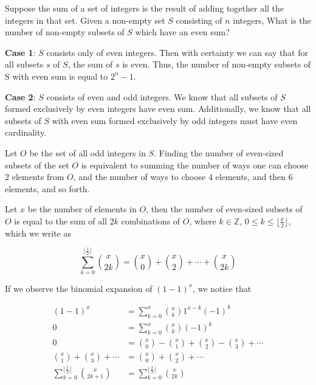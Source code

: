 \documentclass{article}
\begin{document}
Suppose the sum of a set of integers is the result of adding together all the integers in that set. Given a non-empty set $S$ consisting of $n$ integers, What is the number of non-empty subsets of $S$ which have an even sum? 

\vspace{5mm}

\textbf{Case 1}: $S$ consists only of even integers. Then with certainty we can say that for all subsets $s$ of $S$, the sum of $s$ is even. Thus, the number of non-empty subsets of S with even sum is equal to $2^{n}-1$.

\vspace{5mm}

\textbf{Case 2}: $S$ consists of even and odd integers. We know that all subsets of $S$ formed exclusively by even integers have even sum. Additionally, we know that all subsets of $S$ with even sum formed exclusively by odd integers must have even cardinality. 

\vspace{5mm}

Let $O$ be the set of all odd integers in $S$. Finding the number of even-sized subsets of the set $O$ is equivalent to summing the number of ways one can choose 2 elements from $O$, and the number of ways to choose 4 elements, and then 6 elements, and so forth. 
\vspace{5mm}

Let $x$ be the number of elements in $O$, then the number of even-sized subsets of $O$ is equal to the sum of all $2k$ combinations of $O$, where $k \in \mathbb{Z}$, $0 \le k \le \lfloor \frac{x}{2} \rfloor$, which we write as

\begin{equation}
\displaystyle\sum_{k=0}^{\lfloor \frac{x}{2} \rfloor} \binom{x}{2k} = \binom{x}{0} + \binom{x}{2} + \cdots + \binom{x}{2k}
\end{equation}

\vspace{5mm}

If we observe the binomial expansion of $(1-1)^{x}$, we notice that

  \begin{align*}
    (1-1)^{x} &= \displaystyle\sum_{k=0}^{x} \binom{x}{k}1^{x-k}(-1)^{k}\\
    0 &= \displaystyle\sum_{k=0}^{x} \binom{x}{k}(-1)^{k}\\
    0 &= \binom{x}{0} - \binom{x}{1} + \binom{x}{2} - \binom{x}{3} + \cdots \\
    \binom{x}{1} +  \binom{x}{3} + \cdots &= \binom{x}{0} + \binom{x}{2}+ \cdots\\
    \displaystyle\sum_{k=0}^{\lfloor \frac{x}{2} \rfloor} \binom{x}{2k+1} &=   \displaystyle\sum_{k=0}^{\lfloor \frac{x}{2} \rfloor} \binom{x}{2k}\\
  \end{align*}
  
\end{document}
